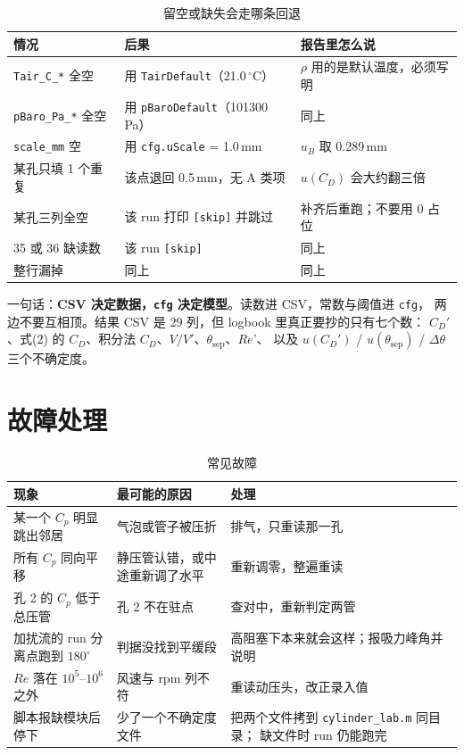\documentclass[11pt,a4paper]{ctexart}
\newcommand{\Cp}{\ensuremath{C_p}}
\newcommand{\CD}{\ensuremath{C_D}}
\newcommand{\ReD}{\ensuremath{\mathit{Re}}}
\begin{document}
\begin{table}[H]
\centering
\caption{留空或缺失会走哪条回退}
\small
\begin{tabularx}{\textwidth}{@{}p{4.4cm} p{4.3cm} X@{}}
\toprule
情况 & 后果 & 报告里怎么说 \\
\midrule
\texttt{Tair\_C\_*} 全空 & 用 \texttt{TairDefault}（21.0\,$^\circ$C） & $\rho$ 用的是默认温度，必须写明 \\
\texttt{pBaro\_Pa\_*} 全空 & 用 \texttt{pBaroDefault}（101300\,Pa） & 同上 \\
\texttt{scale\_mm} 空 & 用 \texttt{cfg.uScale} = 1.0\,mm & $u_B$ 取 0.289\,mm \\
某孔只填 1 个重复 & 该点退回 0.5\,mm，无 A 类项 & $u(\CD)$ 会大约翻三倍 \\
某孔三列全空 & 该 run 打印 \texttt{[skip]} 并跳过 & 补齐后重跑；不要用 0 占位 \\
35 或 36 缺读数 & 该 run \texttt{[skip]} & 同上 \\
整行漏掉 & 同上 & 同上 \\
\bottomrule
\end{tabularx}
\end{table}

一句话：\textbf{CSV 决定数据，\texttt{cfg} 决定模型}。读数进 CSV，常数与阈值进 \texttt{cfg}，
两边不要互相顶。结果 CSV 是 29 列，但 logbook 里真正要抄的只有七个数：
$\CD'$、式(2) 的 $\CD$、积分法 $\CD$、$V/V'$、$\theta_{\text{sep}}$、\ReD{}'、
以及 $u(\CD')$ / $u(\theta_{\text{sep}})$ / $\Delta\theta$ 三个不确定度。

\section{故障处理}

\begin{table}[H]
\centering
\caption{常见故障}
\small
\begin{tabularx}{\textwidth}{@{}p{4.6cm} X p{5.6cm}@{}}
\toprule
现象 & 最可能的原因 & 处理 \\
\midrule
某一个 \Cp{} 明显跳出邻居 & 气泡或管子被压折 & 排气，只重读那一孔 \\
所有 \Cp{} 同向平移 & 静压管认错，或中途重新调了水平 & 重新调零，整遍重读 \\
孔 2 的 \Cp{} 低于总压管 & 孔 2 不在驻点 & 查对中，重新判定两管 \\
加扰流的 run 分离点跑到 $180^\circ$ & 判据没找到平缓段 & 高阻塞下本来就会这样；报吸力峰角并说明 \\
\ReD{} 落在 $10^5$--$10^6$ 之外 & 风速与 rpm 列不符 & 重读动压头，改正录入值 \\
脚本报缺模块后停下 & 少了一个不确定度文件 & 把两个文件拷到 \texttt{cylinder\_lab.m} 同目录；
缺文件时 run 仍能跑完 \\
\bottomrule
\end{tabularx}
\end{table}
\end{document}
